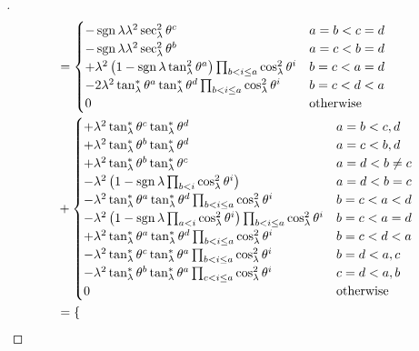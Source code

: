 \documentclass[../main.tex]{subfiles}
\begin{document}
\begin{proof}[]
\begin{align*}
&=\begin{cases}
-\sign{\lambda}\lambda^2\sec_\lambda^2\tensor{\theta}{^c}&\text{$a=b<c=d$}\\
-\sign{\lambda}\lambda^2\sec_\lambda^2\tensor{\theta}{^b}&\text{$a=c<b=d$}\\
+\lambda^2\left(1-\sign{\lambda}\tan_\lambda^2\tensor{\theta}{^a}\right)\prod_{b<i\le a}{\cos_\lambda^2\tensor{\theta}{^i}}&\text{$b=c<a=d$}\\
-2\lambda^2\tan_\lambda^\ast\tensor{\theta}{^a}\tan_\lambda^\ast\tensor{\theta}{^d}\prod_{b<i\le a}{\cos_\lambda^2\tensor{\theta}{^i}}&\text{$b=c<d<a$}\\
0&\text{otherwise}\\
\end{cases}\\
&+\begin{cases}
+\lambda^2\tan_\lambda^\ast\tensor{\theta}{^c}\tan_\lambda^\ast\tensor{\theta}{^d}
&\text{$a=b<c,d$}\\
+\lambda^2\tan_\lambda^\ast\tensor{\theta}{^b}\tan_\lambda^\ast\tensor{\theta}{^d}
&\text{$a=c<b,d$}\\
+\lambda^2\tan_\lambda^\ast\tensor{\theta}{^b}\tan_\lambda^\ast\tensor{\theta}{^c}
&\text{$a=d<b\ne c$}\\
-\lambda^2
\left(
1-\sign{\lambda}\prod_{b<i}\cos_\lambda^2\tensor{\theta}{^i}
\right)
&\text{$a=d<b=c$}\\
-\lambda^2\tan_\lambda^\ast\tensor{\theta}{^a}\tan_\lambda^\ast\tensor{\theta}{^d}\prod_{b<i\le a}\cos_\lambda^2\tensor{\theta}{^i}
&\text{$b=c<a<d$}\\
-\lambda^2
\left(
1-\sign{\lambda}\prod_{a<i}\cos_\lambda^2\tensor{\theta}{^i}
\right)
\prod_{b<i\le a}\cos_\lambda^2\tensor{\theta}{^i}
&\text{$b=c<a=d$}\\
+\lambda^2\tan_\lambda^\ast\tensor{\theta}{^a}\tan_\lambda^\ast\tensor{\theta}{^d}\prod_{b<i\le a}\cos_\lambda^2\tensor{\theta}{^i}
&\text{$b=c<d<a$}\\
-\lambda^2\tan_\lambda^\ast\tensor{\theta}{^c}\tan_\lambda^\ast\tensor{\theta}{^a}\prod_{b<i\le a}\cos_\lambda^2\tensor{\theta}{^i}
&\text{$b=d<a,c$}\\
-\lambda^2\tan_\lambda^\ast\tensor{\theta}{^b}\tan_\lambda^\ast\tensor{\theta}{^a}\prod_{c<i\le a}\cos_\lambda^2\tensor{\theta}{^i}
&\text{$c=d<a,b$}\\
0&\text{otherwise}\\
\end{cases}\\
&=\begin{cases}

\end{cases}
\end{align*}
\end{proof}
\end{document}
